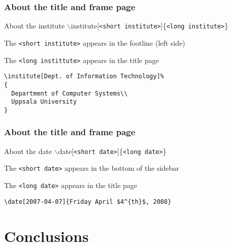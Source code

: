 \documentclass{beamer}
\begin{document}
\begin{frame}[fragile]
  \frametitle{About the title and frame page}
  \begin{block}{About the institute}
    $\backslash$institute[\texttt{<short institute>}]\{\texttt{<long institute>}\}
  \end{block}
  
  The \texttt{<short institute>} appears in the footline (left side)
  
  The \texttt{<long instittute>} appears in the title page

  \begin{example}
\begin{verbatim}
\institute[Dept. of Information Technology]%
{
  Department of Computer Systems\\
  Uppsala University
}
\end{verbatim}
  \end{example}

\end{frame}

\begin{frame}[fragile]
  \frametitle{About the title and frame page}
  
  \begin{block}{About the date}
    $\backslash$date[\texttt{<short date>}]\{\texttt{<long date>}\}
  \end{block}
    
  The \texttt{<short date>} appears in the bottom of the sidebar

  The \texttt{<long date>} appears in the title page
    
  \begin{example}
\begin{verbatim}
\date[2007-04-07]{Friday April $4^{th}$, 2008}
\end{verbatim}
  \end{example}
\end{frame}

\section{Conclusions}
\end{document}
